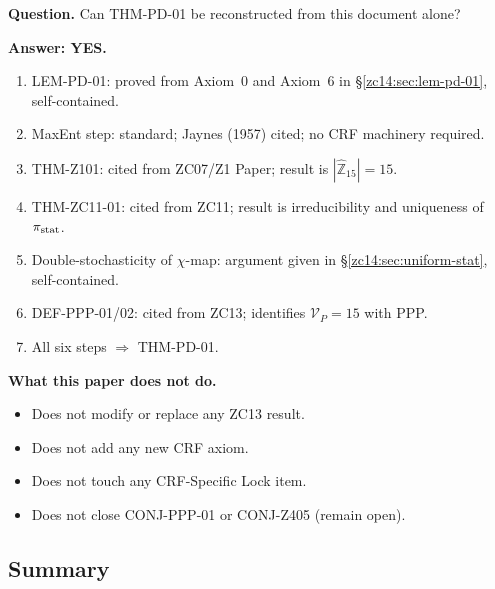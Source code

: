 \documentclass[12pt, a4paper]{article}
\begin{document}
\begin{formalbox}[title={Reconstruction Test (CUIP No-Loss)}]
\textbf{Question.} Can THM-PD-01 be reconstructed from this
document alone?

\textbf{Answer: YES.}
\begin{enumerate}[leftmargin=*, noitemsep]
  \item LEM-PD-01: proved from Axiom~0 and Axiom~6 in
    \S\ref{zc14:sec:lem-pd-01}, self-contained.
  \item MaxEnt step: standard; Jaynes (1957) cited; no CRF
    machinery required.
  \item THM-Z101: cited from ZC07/Z1 Paper; result is
    $|\widehat{\mathbb{Z}}_{15}|=15$.
  \item THM-ZC11-01: cited from ZC11; result is irreducibility
    and uniqueness of $\pi_{\rm stat}$.
  \item Double-stochasticity of $\chi$-map: argument given
    in \S\ref{zc14:sec:uniform-stat}, self-contained.
  \item DEF-PPP-01/02: cited from ZC13; identifies
    $\mathcal{V}_P=15$ with PPP.
  \item All six steps $\Rightarrow$ THM-PD-01.
\end{enumerate}

\textbf{What this paper does not do.}
\begin{itemize}[leftmargin=*, noitemsep]
  \item Does not modify or replace any ZC13 result.
  \item Does not add any new CRF axiom.
  \item Does not touch any CRF-Specific Lock item.
  \item Does not close CONJ-PPP-01 or CONJ-Z405 (remain open).
\end{itemize}
\end{formalbox}

\subsection{Summary}
\label{zc14:sec:summary}
\end{document}
